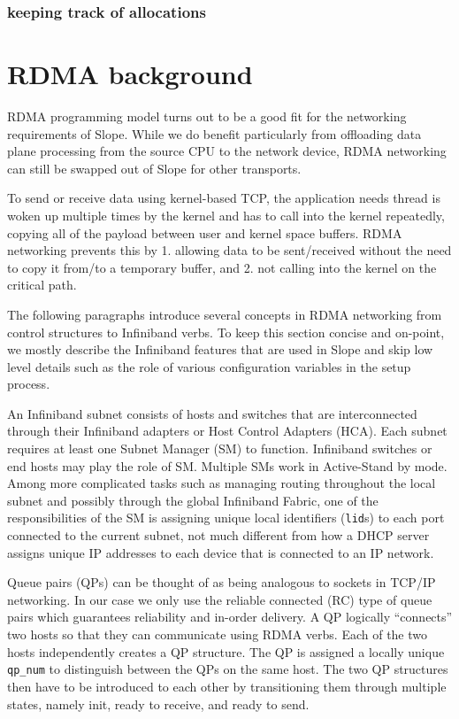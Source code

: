 

\subsubsection{keeping track of allocations}
\label{subsec:trackallocations}


\section{RDMA background}
RDMA programming model turns out to be a good fit for the networking
requirements of Slope. While we do benefit particularly from
offloading data plane processing from the source CPU to the network device,
RDMA networking can still be swapped out of Slope for other transports.

To send or receive data using kernel-based TCP, the application needs thread
is woken up multiple times by the kernel and has to call into the kernel
repeatedly, copying all of the payload between user and kernel space buffers.
RDMA networking prevents this by 1. allowing data to be sent/received without
the need to copy it from/to a temporary buffer, and 2. not calling into the
kernel on the critical path.

The following paragraphs introduce several concepts in RDMA
networking from control structures to Infiniband verbs. To keep this section
concise and on-point, we mostly describe the Infiniband features that are used
in Slope and skip low level details such as the role of various configuration
variables in the setup process.

An Infiniband subnet consists of hosts and switches that are interconnected
through their Infiniband adapters or Host Control Adapters (HCA).
Each subnet requires at least one Subnet Manager (SM) to function.
Infiniband switches or end hosts may play the role of SM. Multiple SMs
work in Active-Stand by mode. Among more complicated tasks such as managing
routing throughout the local subnet and possibly through the global Infiniband
Fabric, one of the responsibilities of the SM is assigning unique local
identifiers (\texttt{lid}s) to each port connected to the current subnet, not much
different from how a DHCP server assigns unique IP addresses to each device
that is connected to an IP network.

Queue pairs (QPs) can be thought of as being analogous to sockets in TCP/IP
networking. In our case we only use the reliable connected (RC) type of queue
pairs which guarantees reliability and in-order delivery.
A QP logically ``connects'' two hosts so that they can communicate using
RDMA verbs. Each of the two hosts independently creates a QP structure. The
QP is assigned a locally unique \texttt{qp\_num} to distinguish between the
QPs on the same host. The two QP structures then have to be introduced to
each other by transitioning them through multiple states, namely init, ready to
receive, and ready to send.

